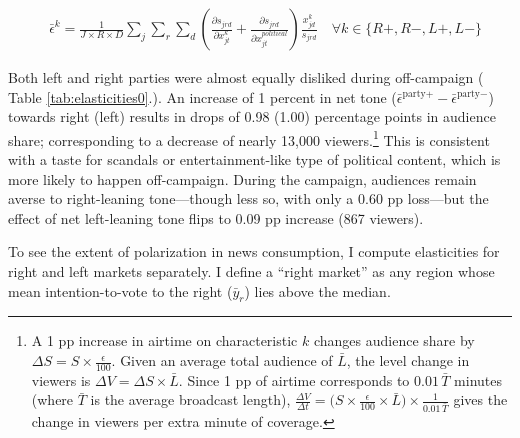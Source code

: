 \documentclass[12pt]{article}
\begin{document}
	
	
	
	\begin{equation}\label{eq:elasticities}
		\begin{aligned}
			& \bar{\epsilon}^k= \frac{1}{J\times R \times D}\sum_{j}\sum_{r} \sum_{d} \left(\frac{\partial s_{jrd}}{\partial x_{jt}^k} +  \frac{\partial s_{jrd}}{\partial x_{jt}^{political}} \right) \frac{x_{jd}^k}{s_{jrd}}    \quad \forall k \in \{R+,R-,L+,L-\}
		\end{aligned}
	\end{equation}             
	
	
	
	Both left and right parties were almost equally disliked during off-campaign ( Table \ref{tab:elasticities0}.). An increase of 1 percent in net tone ($\bar{\epsilon}^{\text{party}+}-\bar{\epsilon}^{\text{party}-}$) towards right (left) results in drops of 0.98 (1.00) percentage points in audience share; corresponding to a decrease of nearly 13,000 viewers.\footnote{A 1 pp increase in airtime on characteristic $k$ changes audience share by $\Delta S = S \times \tfrac{\epsilon}{100}$. Given an average total audience of $\bar{L}$, the level change in viewers is $\Delta V = \Delta S \times \bar{L}$. Since 1 pp of airtime corresponds to $0.01\,\bar{T}$ minutes (where $\bar{T}$ is the average broadcast length), $\tfrac{\Delta V}{\Delta t} = \bigl(S \times \tfrac{\epsilon}{100} \times \bar{L}\bigr) \times \tfrac{1}{0.01\,\bar{T}}$ gives the change in viewers per extra minute of coverage.} This is consistent with a taste for scandals or entertainment-like type of political content, which is more likely to happen off-campaign. During the campaign, audiences remain averse to right-leaning tone—though less so, with only a 0.60 pp loss—but the effect of net left-leaning tone flips to 0.09 pp increase (867 viewers).
	
	
	To see the extent of polarization in news consumption, I  compute elasticities for right and left markets separately. I define a “right market” as any region whose mean intention-to-vote to the right  ($\bar{y}_r$) lies above the median. 
	
\end{document}
